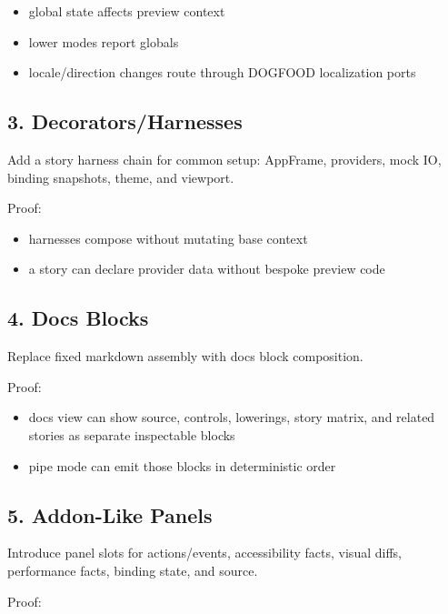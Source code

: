 \begin{itemize}
\tightlist
\item
  global state affects preview context
\item
  lower modes report globals
\item
  locale/direction changes route through DOGFOOD localization ports
\end{itemize}

\subsection{3. Decorators/Harnesses}\label{record-135-decoratorsharnesses}

Add a story harness chain for common setup: AppFrame, providers, mock IO, binding snapshots, theme, and viewport.

Proof:

\begin{itemize}
\tightlist
\item
  harnesses compose without mutating base context
\item
  a story can declare provider data without bespoke preview code
\end{itemize}

\subsection{4. Docs Blocks}\label{record-135-docs-blocks}

Replace fixed markdown assembly with docs block composition.

Proof:

\begin{itemize}
\tightlist
\item
  docs view can show source, controls, lowerings, story matrix, and related stories as separate inspectable blocks
\item
  pipe mode can emit those blocks in deterministic order
\end{itemize}

\subsection{5. Addon-Like Panels}\label{record-135-addon-like-panels}

Introduce panel slots for actions/events, accessibility facts, visual diffs, performance facts, binding state, and source.

Proof:


